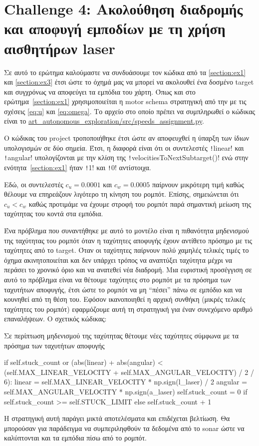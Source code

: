 \section{Challenge 4: Ακολούθηση διαδρομής και αποφυγή εμποδίων με τη χρήση αισθητήρων laser}\label{section:ex4}
Σε αυτό το ερώτημα καλούμαστε να συνδυάσουμε τον κώδικα από τα \ref{section:ex1} και \ref{section:ex3} έτσι ώστε το όχημά μας να μπορεί να ακολουθεί ένα δοσμένο target και συγχρόνως να αποφεύγει τα εμπόδια του χάρτη.
Όπως και στο ερώτημα~\ref{section:ex1} χρησιμοποιείται η motor schema στρατηγική από την \cite{etsardou-phd} με τις σχέσεις \ref{eq:u} και \ref{eq:omega}.
Το αρχείο στο οποίο πρέπει να συμπληρωθεί ο κώδικας είναι το
\url{art_autonomous_exploration/src/speeds_assignment.py}.

Ο κώδικας του project τροποποιήθηκε έτσι ώστε αν αποφευχθεί η ύπαρξη των ίδιων υπολογισμών σε δύο σημεία.
Έτσι, η διαφορά  είναι ότι οι συντελεστές \texttt!linear! και \texttt!angular! υπολογίζονται με την κλίση της \texttt!velocitiesToNextSubtarget()!
ενώ στην ενότητα~\ref{section:ex1} ήταν \texttt!1! και \texttt!0! αντίστοιχα.

Εδώ, οι συντελεστές $c_u = 0.0001$ και $c_w = 0.0005$ παίρνουν μικρότερη τιμή καθώς θέλουμε να επηρεάζουν λιγότερο τη κίνηση του ρομπότ.
Επίσης, σημειώνεται ότι $c_u < c_w$ καθώς προτιμάμε να έχουμε στροφή του ρομπότ παρά σημαντική μείωση της ταχύτητας του κοντά στα εμπόδια.

Ένα πρόβλημα που συναντήθηκε με αυτό το μοντέλο είναι η πιθανότητα μηδενισμού της ταχύτητας του ρομπότ όταν η ταχύτητες αποφυγής έχουν αντίθετο πρόσημο με τις ταχύτητες από το target.
Όταν οι ταχύτητες παίρνουν πολύ χαμηλές τελικές τιμές το όχημα ακινητοποιείται και δεν υπάρχει τρόπος να αναπτύξει ταχύτητα μέχρι να περάσει το χρονικό όριο και να ανατεθεί νέα διαδρομή.
Μια ευριστική προσέγγιση σε αυτό το πρόβλημα είναι να θέτουμε ταχύτητες στο ρομπότ με τα πρόσημα των ταχυτήτων αποφυγής, έτσι ώστε το ρομπότ να μη ``πέσει'' πάνω σε εμπόδιο και να κουνηθεί από τη θέση του.
Εφόσον ικανοποιηθεί η αρχική συνθήκη (μικρές τελικές ταχύτητες του ρομπότ) εφαρμόζουμε αυτή τη στρατηγική για έναν συνεχόμενο αριθμό επαναλήψεων.
Ο σχετικός κώδικας:
\begin{code}
\caption{Σε περίπτωση μηδενισμού της ταχύτητας θέτουμε νέες ταχύτητες σύμφωνα με τα πρόσημα των ταχυτήτων αποφυγής}
\begin{pythoncode}
if self.stuck_count or (abs(linear) + abs(angular) < (self.MAX_LINEAR_VELOCITY + self.MAX_ANGULAR_VELOCITY) / 2 / 6):
    linear = self.MAX_LINEAR_VELOCITY * np.sign(l_laser) / 2
    angular = self.MAX_ANGULAR_VELOCITY * np.sign(a_laser)
    self.stuck_count = 0 if self.stuck_count >= self.STUCK_LIMIT else self.stuck_count + 1
\end{pythoncode}
\end{code}
Η στρατηγική αυτή παράγει μικτά αποτελέσματα και επιδέχεται βελτίωση.
Θα μπορούσαν για παράδειγμα να συμπεριληφθούν τα δεδομένα από το sonar ώστε να καλύπτονται και τα εμπόδια πίσω από το ρομπότ.

